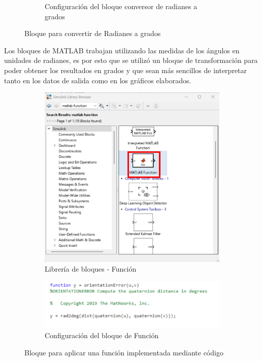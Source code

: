 \begin{figure}[htbp]
\begin{subfigure}[b]{0.45\textwidth}
        \caption{Configuración del bloque conversor de radianes a grados}
        \label{fig:conf_bloques_R2D}
    \end{subfigure}
    \caption{Bloque para convertir de Radianes a grados}
    \label{fig:bloques_R2D}
\end{figure}

Los bloques de MATLAB trabajan utilizando las medidas de los ángulos en unidades de radianes, es por esto que se utilizó un bloque de transformación para poder obtener los resultados en grados y que sean más sencillos de interpretar tanto en los datos de salida como en los gráficos elaborados.

\newpage

\begin{figure}[htbp]
    \centering
    \begin{subfigure}[b]{0.35\textwidth}
        \centering
        \includegraphics[width=\textwidth]{fig/Capitulo5/Caso_de_estudio_IMU/Generador_de_salidas/libreria_bloque_de_funcion.pdf}
        \caption{Librería de bloques - Función}
        \label{fig:lib_bloques_func}
    \end{subfigure}
    \hfill
    \begin{subfigure}[b]{0.45\textwidth}
        \centering
        \includegraphics[width=\textwidth]{fig/Capitulo5/Caso_de_estudio_IMU/Generador_de_salidas/configuracion_codigo.pdf}
        \caption{Configuración del bloque de Función}
        \label{fig:config_bloques_func}
    \end{subfigure}
    \caption{Bloque para aplicar una función implementada mediante código}
    \label{fig:bloques_func}
\end{figure}

